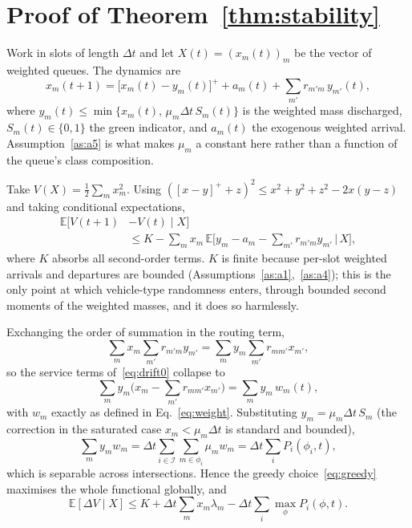 \documentclass[journal]{IEEEtran}
\begin{document}
\section{Proof of Theorem~\ref{thm:stability}}
\label{app:thm1}
Work in slots of length $\Delta t$ and let $X(t)=(x_m(t))_m$ be the
vector of weighted queues. The dynamics are
\begin{equation}
x_m(t+1) = \big[x_m(t) - y_m(t)\big]^+ + a_m(t)
           + \sum_{m'} r_{m'm}\, y_{m'}(t),
\label{eq:dynamics}
\end{equation}
where $y_m(t) \le \min\{x_m(t),\, \mu_m \Delta t\, S_m(t)\}$ is the
weighted mass discharged, $S_m(t)\in\{0,1\}$ the green indicator, and
$a_m(t)$ the exogenous weighted arrival. Assumption~\ref{as:a5} is what
makes $\mu_m$ a constant here rather than a function of the queue's class
composition.

Take $V(X)=\tfrac12\sum_m x_m^2$. Using
$([x-y]^+ + z)^2 \le x^2 + y^2 + z^2 - 2x(y-z)$ and taking conditional
expectations,
\begin{equation}
\begin{aligned}
\mathbb{E}[V(t{+}1)&-V(t)\mid X]\\
 &\le K - \sum_m x_m\, \mathbb{E}\Big[y_m - a_m
   - \textstyle\sum_{m'} r_{m'm} y_{m'} \,\Big|\, X\Big],
\end{aligned}
\label{eq:drift0}
\end{equation}
where $K$ absorbs all second-order terms. $K$ is finite because per-slot
weighted arrivals and departures are bounded
(Assumptions~\ref{as:a1},~\ref{as:a4}); this is the only point at which
vehicle-type randomness enters, through bounded second moments of the
weighted masses, and it does so harmlessly.

Exchanging the order of summation in the routing term,
\begin{equation}
\sum_m x_m \sum_{m'} r_{m'm} y_{m'}
 = \sum_{m} y_{m} \sum_{m'} r_{mm'} x_{m'},
\end{equation}
so the service terms of~\eqref{eq:drift0} collapse to
\begin{equation}
\sum_m y_m \Big( x_m - \sum_{m'} r_{mm'} x_{m'} \Big)
 = \sum_m y_m\, w_m(t),
\label{eq:collapse}
\end{equation}
with $w_m$ exactly as defined in Eq.~\eqref{eq:weight}. Substituting
$y_m = \mu_m \Delta t\, S_m$ (the correction in the saturated case
$x_m < \mu_m\Delta t$ is standard and bounded),
\begin{equation}
\sum_m y_m w_m = \Delta t \sum_{i\in\mathcal{I}}
 \sum_{m\in\phi_i} \mu_m w_m = \Delta t \sum_i P_i(\phi_i,t),
\end{equation}
which is separable across intersections. Hence the greedy
choice~\eqref{eq:greedy} maximises the whole functional globally, and
\begin{equation}
\mathbb{E}[\Delta V \mid X] \le K + \Delta t\sum_m x_m \lambda_m
 - \Delta t \sum_i \max_{\phi} P_i(\phi,t).
\label{eq:drift1}
\end{equation}
\end{document}

